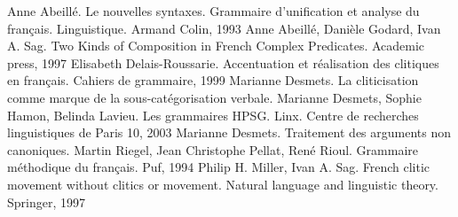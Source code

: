 \begin{thebibliography}{}

 Anne Abeillé. Le nouvelles syntaxes. Grammaire d'unification et analyse du français. Linguistique. Armand Colin, 1993
 Anne Abeillé, Danièle Godard, Ivan A. Sag. Two Kinds of Composition in French Complex Predicates. Academic press, 1997
 Elisabeth Delais-Roussarie. Accentuation et réalisation des clitiques en français. Cahiers de grammaire, 1999
 Marianne Desmets. La cliticisation comme marque de la sous-catégorisation verbale.
 Marianne Desmets, Sophie Hamon, Belinda Lavieu. Les grammaires HPSG. Linx. Centre de recherches linguistiques de Paris 10, 2003
 Marianne Desmets. Traitement des arguments non canoniques.
 Martin Riegel, Jean Christophe Pellat, René Rioul. Grammaire méthodique du français. Puf, 1994
 Philip H. Miller, Ivan A. Sag. French clitic movement without clitics or movement. Natural language and linguistic theory. Springer, 1997

\end{thebibliography}

